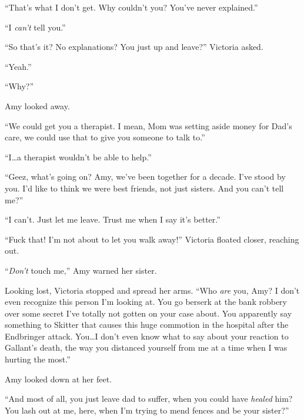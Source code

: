 ``That's what I don't get.  Why couldn't you?  You've never explained.''



``I \emph{can't} tell you.''



``So that's it?  No explanations?  You just up and leave?'' Victoria asked.



``Yeah.''



``Why?''



Amy looked away.



``We could get you a therapist.  I mean, Mom was setting aside money for Dad's care, we could use that to give you someone to talk to.''



``I\ldots a therapist wouldn't be able to help.''



``Geez, what's going on?  Amy, we've been together for a decade.  I've stood by you.  I'd like to think we were best friends, not just sisters.  And you can't tell me?''



``I can't.  Just let me leave.  Trust me when I say it's better.''



``Fuck that!  I'm not about to let you walk away!''  Victoria floated closer, reaching out.



``\emph{Don't} touch me,'' Amy warned her sister.



Looking lost, Victoria stopped and spread her arms.  ``Who \emph{are} you, Amy?  I don't even recognize this person I'm looking at.  You go berserk at the bank robbery over some secret I've totally not gotten on your case about.  You apparently say something to Skitter that causes this huge commotion in the hospital after the Endbringer attack.  You\ldots I don't even know what to say about your reaction to Gallant's death, the way you distanced yourself from me at a time when I was hurting the most.''



Amy looked down at her feet.



``And most of all, you just leave dad to suffer, when you could have \emph{healed} him?  You lash out at me, here, when I'm trying to mend fences and be your sister?''



